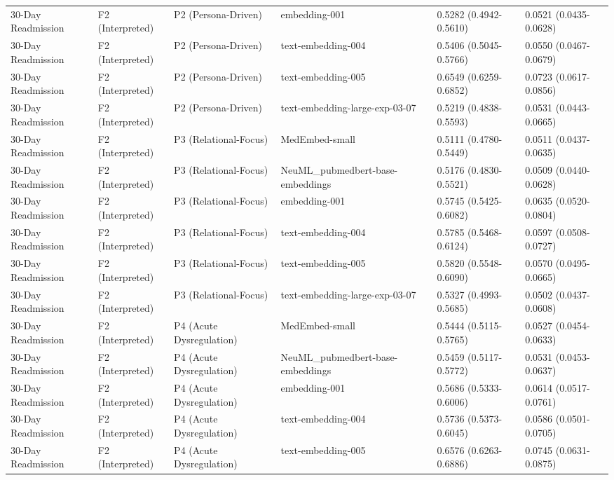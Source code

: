 \begin{tabular}{llllll}
30-Day Readmission & F2 (Interpreted) & P2 (Persona-Driven) & embedding-001 & 0.5282 (0.4942-0.5610) & 0.0521 (0.0435-0.0628) \\
30-Day Readmission & F2 (Interpreted) & P2 (Persona-Driven) & text-embedding-004 & 0.5406 (0.5045-0.5766) & 0.0550 (0.0467-0.0679) \\
30-Day Readmission & F2 (Interpreted) & P2 (Persona-Driven) & text-embedding-005 & 0.6549 (0.6259-0.6852) & 0.0723 (0.0617-0.0856) \\
30-Day Readmission & F2 (Interpreted) & P2 (Persona-Driven) & text-embedding-large-exp-03-07 & 0.5219 (0.4838-0.5593) & 0.0531 (0.0443-0.0665) \\
30-Day Readmission & F2 (Interpreted) & P3 (Relational-Focus) & MedEmbed-small & 0.5111 (0.4780-0.5449) & 0.0511 (0.0437-0.0635) \\
30-Day Readmission & F2 (Interpreted) & P3 (Relational-Focus) & NeuML\_pubmedbert-base-embeddings & 0.5176 (0.4830-0.5521) & 0.0509 (0.0440-0.0628) \\
30-Day Readmission & F2 (Interpreted) & P3 (Relational-Focus) & embedding-001 & 0.5745 (0.5425-0.6082) & 0.0635 (0.0520-0.0804) \\
30-Day Readmission & F2 (Interpreted) & P3 (Relational-Focus) & text-embedding-004 & 0.5785 (0.5468-0.6124) & 0.0597 (0.0508-0.0727) \\
30-Day Readmission & F2 (Interpreted) & P3 (Relational-Focus) & text-embedding-005 & 0.5820 (0.5548-0.6090) & 0.0570 (0.0495-0.0665) \\
30-Day Readmission & F2 (Interpreted) & P3 (Relational-Focus) & text-embedding-large-exp-03-07 & 0.5327 (0.4993-0.5685) & 0.0502 (0.0437-0.0608) \\
30-Day Readmission & F2 (Interpreted) & P4 (Acute Dysregulation) & MedEmbed-small & 0.5444 (0.5115-0.5765) & 0.0527 (0.0454-0.0633) \\
30-Day Readmission & F2 (Interpreted) & P4 (Acute Dysregulation) & NeuML\_pubmedbert-base-embeddings & 0.5459 (0.5117-0.5772) & 0.0531 (0.0453-0.0637) \\
30-Day Readmission & F2 (Interpreted) & P4 (Acute Dysregulation) & embedding-001 & 0.5686 (0.5333-0.6006) & 0.0614 (0.0517-0.0761) \\
30-Day Readmission & F2 (Interpreted) & P4 (Acute Dysregulation) & text-embedding-004 & 0.5736 (0.5373-0.6045) & 0.0586 (0.0501-0.0705) \\
30-Day Readmission & F2 (Interpreted) & P4 (Acute Dysregulation) & text-embedding-005 & 0.6576 (0.6263-0.6886) & 0.0745 (0.0631-0.0875) \\

\end{tabular}
